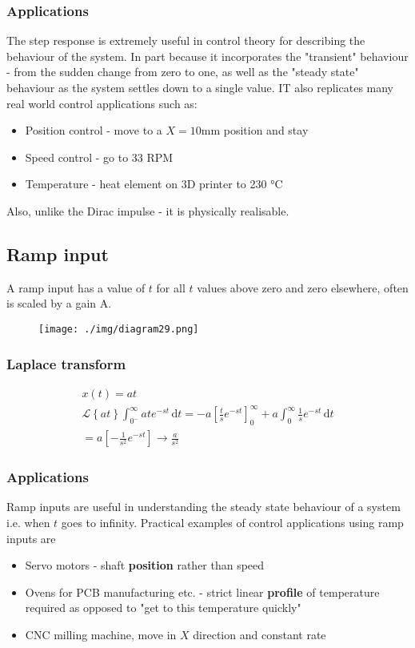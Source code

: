 \subsubsection{Applications}
The step response is extremely useful in control theory for describing the behaviour of the system. In part because it incorporates the "transient" behaviour - from the sudden change from zero to one, as well as the "steady state" behaviour as the system settles down to a single value. IT also replicates many real world control applications such as:
\begin{itemize}
  \item Position control - move to a $X=10\si{\milli\meter}$ position and stay
  \item Speed control - go to 33 RPM
  \item Temperature - heat element on 3D printer to 230 \si{\celsius}
\end{itemize}
Also, unlike the Dirac impulse - it is physically realisable.
\subsection{Ramp input}
A ramp input has a value of $t$ for all $t$ values above zero and zero elsewhere, often is scaled by a gain A.
\begin{figure}[H]
  \centering
  \texttt{[image: ./img/diagram29.png]}
\end{figure}
\subsubsection{Laplace transform}
\begin{gather}
  x(t) = at\\
  \mathcal{L} \left\{ at \right\} \int_{0^-}^{\infty} ate^{-st} \,\mathrm{d}t = -a \left[ \frac{t}{s}e^{-st} \right]_{0}^{\infty} + a\int_{0}^{\infty} \frac{1}{s} e^{-st} \,\mathrm{d}t\\
  = a \left[ -\frac{1}{s^2}e^{-st} \right] \rightarrow \frac{a}{s^2}
\end{gather}
\subsubsection{Applications}
Ramp inputs are useful in understanding the steady state behaviour of a system i.e. when $t$ goes to infinity. Practical examples of control applications using ramp inputs are
\begin{itemize}
  \item Servo motors - shaft \textbf{position} rather than speed
  \item Ovens for PCB manufacturing etc. - strict linear \textbf{profile} of temperature required as opposed to "get to this temperature quickly"
  \item CNC milling machine, move in $X$ direction and constant rate
\end{itemize}
